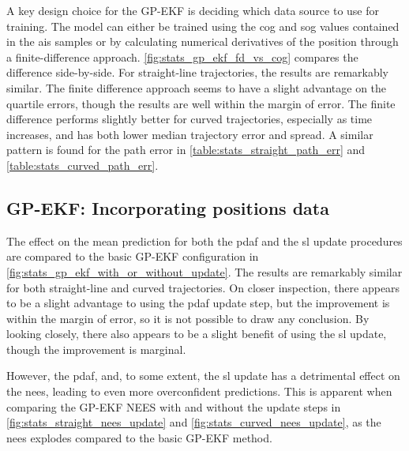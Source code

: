 A key design choice for the GP-EKF is deciding which data source to use for training. The model can either be trained using the \acrshort{cog} and \acrshort{sog} values contained in the \acrshort{ais} samples or by calculating numerical derivatives of the position through a finite-difference approach. \cref{fig:stats_gp_ekf_fd_vs_cog} compares the difference side-by-side. For straight-line trajectories, the results are remarkably similar. The finite difference approach seems to have a slight advantage on the quartile errors, though the results are well within the margin of error. The finite difference performs slightly better for curved trajectories, especially as time increases, and has both lower median trajectory error and spread. A similar pattern is found for the path error in \cref{table:stats_straight_path_err} and \cref{table:stats_curved_path_err}.

\subsection{GP-EKF: Incorporating positions data}
The effect on the mean prediction for both the \acrshort{pdaf} and the \acrshort{sl} update procedures are compared to the basic GP-EKF configuration in \cref{fig:stats_gp_ekf_with_or_without_update}. The results are remarkably similar for both straight-line and curved trajectories. On closer inspection, there appears to be a slight advantage to using the \acrshort{pdaf} update step, but the improvement is within the margin of error, so it is not possible to draw any conclusion. By looking closely, there also appears to be a slight benefit of using the \acrshort{sl} update, though the improvement is marginal.

However, the \acrshort{pdaf}, and, to some extent, the \acrshort{sl} update has a detrimental effect on the \acrshort{nees}, leading to even more overconfident predictions. This is apparent when comparing the GP-EKF NEES with and without the update steps in \cref{fig:stats_straight_nees_update} and \cref{fig:stats_curved_nees_update}, as the \acrshort{nees} explodes compared to the basic GP-EKF method.










